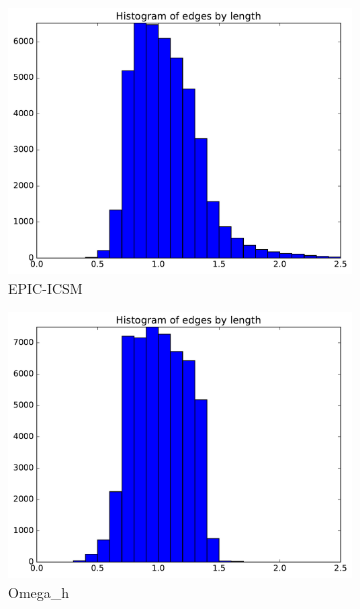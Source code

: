 \documentclass[3p,times,procedia,number]{elsarticle}
\begin{document}
\begin{figure}
\begin{subfigure}{.4\textwidth}
\includegraphics[width=\textwidth]{epic-icsm-cube-cylinder-linear-length.pdf}
\caption{EPIC-ICSM}
\end{subfigure}
\begin{subfigure}{.4\textwidth}
\centering
\includegraphics[width=\textwidth]{omega_h-cube-cylinder-linear-length.pdf}
\caption{Omega\_h}
\end{subfigure}
\begin{subfigure}{.4\textwidth}
\centering

\end{subfigure}
\end{figure}
\end{document}
